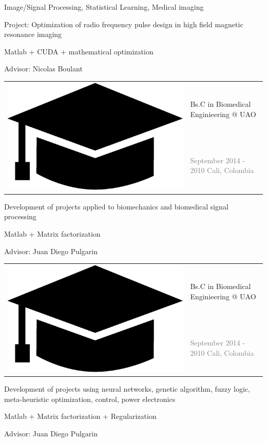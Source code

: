 \documentclass[letterpaper]{article}
\begin{document}
\begin{minipage}[t]{1.\linewidth}
\begin{minipage}{0.47\linewidth}
\begin{minipage}{1\linewidth}
		{\small Image/Signal Processing, Statistical Learning, Medical imaging
		
		\smallskip
		\textmd{Project:} Optimization of radio frequency pulse design in high 
		field magnetic resonance imaging
		
		\smallskip
		Matlab + CUDA + mathematical optimization
		
		\smallskip
		\textmd{Advisor:} Nicolas Boulant}
	\end{minipage} %
	\begin{minipage}{1\linewidth} %
		\vspace{4ex}
		\begin{tabularx}{1\textwidth}{rX}				
			\multirow{2}{*}{\includegraphics[trim= 0.1cm 0.1cm 0.1cm 0.1cm,	
			clip=true, width=0.12\linewidth]{hat.eps}} & {\large Bs.C in 
			Biomedical Enginieering @ UAO}\\
			& {\small\textcolor{gray}{September 2014 - 2010 \hfill Cali, 
			Colombia}}\\
		\end{tabularx}
		\vspace{0.1cm}
		
		{\small Development of projects applied to biomechanics and biomedical 
		signal processing
		
		\smallskip
		Matlab + Matrix factorization
		
		\smallskip
		\textmd{Advisor:} Juan Diego Pulgarin}
	\end{minipage} %
	\begin{minipage}{1\linewidth} %
		\vspace{4ex}
		\begin{tabularx}{1\textwidth}{rX}				
			\multirow{2}{*}{\includegraphics[trim= 0.1cm 0.1cm 0.1cm 0.1cm, 
			clip=true, width=0.12\linewidth]{hat.eps}} & {\large Bs.C in 
			Biomedical Enginieering @ UAO}\\
			& {\small\textcolor{gray}{September 2014 - 2010 \hfill Cali, 
			Colombia}}
		\end{tabularx}
		\vspace{0.1ex}
		
		{\small Development of projects using neural networks, genetic 
		algorithm, fuzzy logic, meta-heuristic optimization, control, power 
		electronics
				
		\smallskip
		Matlab + Matrix factorization + Regularization
		
		\smallskip
		\textmd{Advisor:} Juan Diego Pulgarin}\\
	\end{minipage} %
\end{minipage}
\end{minipage}\\
\end{document}
